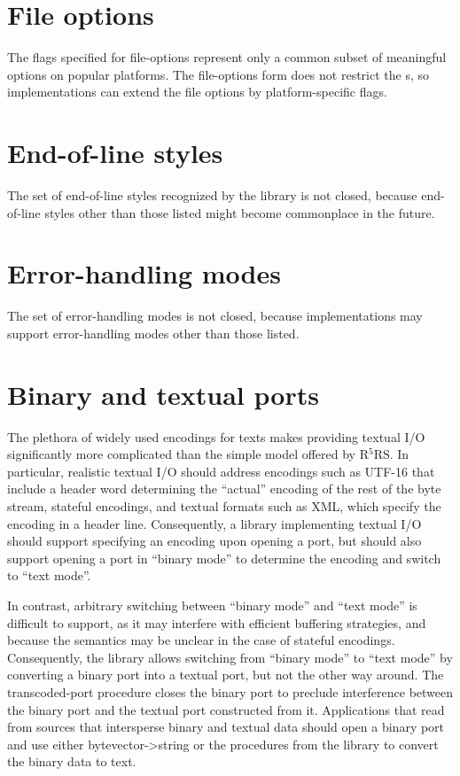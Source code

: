 \documentclass[twoside,twocolumn]{algol60}
\newcommand{\rn}[1]{R$^{#1}$RS}
\begin{document}
\section{File options}

The flags specified for {\cf file-options} represent only a common
subset of meaningful options on popular platforms.  The {\cf
  file-options} form does not restrict the s,
so implementations can extend the file options by platform-specific
flags.

\section{End-of-line styles}

The set of end-of-line styles recognized by the 
library is not closed, because end-of-line styles other than those
listed might become commonplace in the future.

\section{Error-handling modes}

The set of error-handling modes is not closed, because implementations
may support error-handling modes other than those listed.

\section{Binary and textual ports}

The plethora of widely used encodings for texts makes providing
textual I/O significantly more complicated than the simple model
offered by \rn{5}.  In particular, realistic textual I/O should
address encodings such as UTF-16 that include a header word
determining the ``actual'' encoding of the rest of the byte stream,
stateful encodings, and textual formats such as XML, which specify the
encoding in a header line.  Consequently, a library implementing
textual I/O should support specifying an encoding upon opening a port,
but should also support opening a port in ``binary mode'' to determine
the encoding and switch to ``text mode''.

In contrast, arbitrary switching between ``binary mode'' and ``text
mode'' is difficult to support, as it may interfere with efficient
buffering strategies, and because the semantics may be unclear in the
case of stateful encodings.  Consequently, the 
library allows switching from ``binary mode'' to ``text mode'' by
converting a binary port into a textual port, but not the other way
around.  The {\cf transcoded-port} procedure closes the binary port to
preclude interference between the binary port and the textual port
constructed from it.  Applications that read from sources that
intersperse binary and textual data should open a binary port and use
either {\cf bytevector->string} or the procedures from the
 library to convert the binary data to text.
\end{document}
